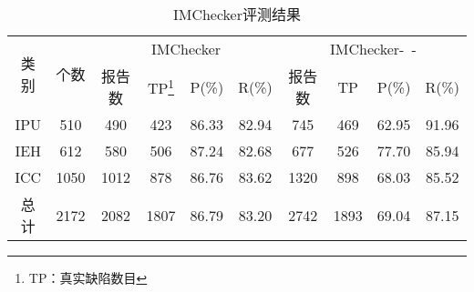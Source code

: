 \begin{table}[t]
	\centering
	\begin{minipage}[t]{0.9\linewidth} %
		\caption{IMChecker评测结果}
		\label{tab:3-4-imchecker}
		\begin{tabular}{cccccccccc}
			\hline
			\multirow{2}{*}{类别 } & \multirow{2}{*}{个数} & \multicolumn{4}{c}{IMChecker} & \multicolumn{4}{c}{IMChecker-~-} \\
			\cline{3-10}
			 & & 报告数 & TP\footnote{TP：真实缺陷数目} & P(\%) & R(\%) & 报告数 & TP& P(\%) & R(\%) \\
			 \hline
			 IPU & 510 & 490 & 423 & 86.33 & 82.94 & 745 & 469 & 62.95 & 91.96 \\
			 IEH & 612 & 580 & 506 & 87.24 & 82.68 & 677 & 526 & 77.70 & 85.94 \\
			 ICC & 1050 & 1012 & 878 & 86.76 & 83.62 & 1320 & 898 & 68.03 & 85.52 \\
			 总计 & 2172 &  2082 & 1807 & 86.79 & 83.20 & 2742 & 1893 & 69.04 & 87.15 \\
			\hline
		\end{tabular}
	\end{minipage}
\end{table}